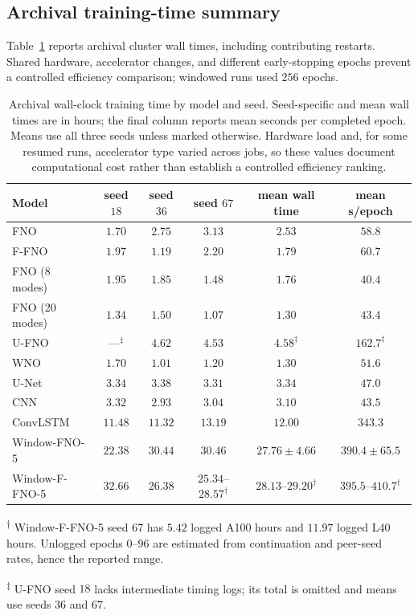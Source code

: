 \FloatBarrier
\subsection{Archival training-time summary}
\label{app:training-time}

Table~\ref{tab:app-training-time} reports archival cluster wall times, including contributing restarts. Shared hardware, accelerator changes, and different early-stopping epochs prevent a controlled efficiency comparison; windowed runs used $256$ epochs.

\begin{table}[!htbp]
\centering
\caption{Archival wall-clock training time by model and seed. Seed-specific and mean wall times are in hours; the final column reports mean seconds per completed epoch. Means use all three seeds unless marked otherwise. Hardware load and, for some resumed runs, accelerator type varied across jobs, so these values document computational cost rather than establish a controlled efficiency ranking.}
\label{tab:app-training-time}
\small
\begin{tabular}{lccccc}
    \toprule
    Model & seed $18$ & seed $36$ & seed $67$ & mean wall time & mean s/epoch \\
    \midrule
    FNO & $1.70$ & $2.75$ & $3.13$ & $2.53$ & $58.8$ \\
    F-FNO & $1.97$ & $1.19$ & $2.20$ & $1.79$ & $60.7$ \\
    FNO (8 modes) & $1.95$ & $1.85$ & $1.48$ & $1.76$ & $40.4$ \\
    FNO (20 modes) & $1.34$ & $1.50$ & $1.07$ & $1.30$ & $43.4$ \\
    U-FNO & ---$^{\ddagger}$ & $4.62$ & $4.53$ & $4.58^{\ddagger}$ & $162.7^{\ddagger}$ \\
    WNO & $1.70$ & $1.01$ & $1.20$ & $1.30$ & $51.6$ \\
    U-Net & $3.34$ & $3.38$ & $3.31$ & $3.34$ & $47.0$ \\
    CNN & $3.32$ & $2.93$ & $3.04$ & $3.10$ & $43.5$ \\
    ConvLSTM & $11.48$ & $11.32$ & $13.19$ & $12.00$ & $343.3$ \\
    \midrule
    Window-FNO-5 & $22.38$ & $30.44$ & $30.46$ & $27.76 \pm 4.66$ & $390.4 \pm 65.5$ \\
    Window-F-FNO-5 & $32.66$ & $26.38$ & $25.34$--$28.57^{\dagger}$ & $28.13$--$29.20^{\dagger}$ & $395.5$--$410.7^{\dagger}$ \\
    \bottomrule
\end{tabular}

\vspace{0.35em}
\begin{minipage}{0.94\linewidth}
\footnotesize
\textsuperscript{\(\dagger\)} Window-F-FNO-5 seed $67$ has $5.42$ logged A100 hours and $11.97$ logged L40 hours. Unlogged epochs $0$--$96$ are estimated from continuation and peer-seed rates, hence the reported range.

\textsuperscript{\(\ddagger\)} U-FNO seed $18$ lacks intermediate timing logs; its total is omitted and means use seeds $36$ and $67$.
\end{minipage}
\end{table}

